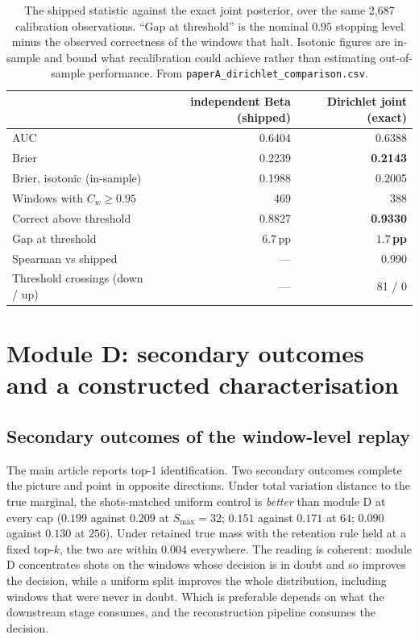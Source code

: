 \documentclass[final,5p,times,longtitle]{elsarticle}
\newenvironment{widetable}{\begin{table}[tbp]}{\end{table}}
\newenvironment{widetable}{\begin{table}[htbp]}{\end{table}}
\theoremstyle{plain}
\newcommand{\Cw}{C_w}
\newcommand{\Smax}{S_{\max}}
\begin{document}
\begin{widetable}
\centering
\small
\caption{The shipped statistic against the exact joint posterior, over the
same 2{,}687 calibration observations. ``Gap at threshold'' is the nominal
$0.95$ stopping level minus the observed correctness of the windows that
halt. Isotonic figures are in-sample and bound what recalibration could
achieve rather than estimating out-of-sample performance. From
\texttt{paperA\_dirichlet\_comparison.csv}.}
\label{tab:dirichlet}
\begin{tabular}{@{}lrr@{}}
\toprule
& independent Beta (shipped) & Dirichlet joint (exact) \\
\midrule
AUC                             & 0.6404 & 0.6388 \\
Brier                           & 0.2239 & \textbf{0.2143} \\
Brier, isotonic (in-sample)     & 0.1988 & 0.2005 \\
Windows with $\Cw\ge0.95$       & 469 & 388 \\
Correct above threshold         & 0.8827 & \textbf{0.9330} \\
Gap at threshold                & $6.7$\,pp & \textbf{$1.7$\,pp} \\
Spearman vs shipped             & --- & 0.990 \\
Threshold crossings (down / up) & --- & 81 / 0 \\
\bottomrule
\end{tabular}
\end{widetable}

\section{Module D: secondary outcomes and a constructed characterisation}
\label{si:dresults}

\subsection{Secondary outcomes of the window-level replay}

The main article reports top-1 identification. Two secondary outcomes
complete the picture and point in opposite directions. Under total
variation distance to the true marginal, the shots-matched uniform control
is \emph{better} than module D at every cap ($0.199$ against $0.209$ at
$\Smax=32$; $0.151$ against $0.171$ at $64$; $0.090$ against $0.130$ at
$256$). Under retained true mass with the retention rule held at a fixed
top-$k$, the two are within $0.004$ everywhere. The reading is coherent:
module D concentrates shots on the windows whose decision is in doubt and
so improves the decision, while a uniform split improves the whole
distribution, including windows that were never in doubt. Which is
preferable depends on what the downstream stage consumes, and the
reconstruction pipeline consumes the decision.
\end{document}
